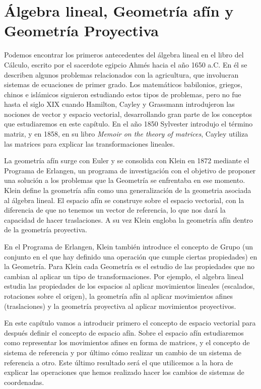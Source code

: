 \documentclass[a4paper,11pt, oneside]{book}
\begin{document}
\section{Álgebra lineal, Geometría afín y Geometría Proyectiva}
Podemos encontrar los primeros antecedentes del álgebra lineal en el libro del Cálculo, escrito por el sacerdote egipcio Ahmés hacia el año 1650 a.C. En él se describen algunos problemas relacionados con la agricultura, que involucran sistemas de ecuaciones de primer grado. Los matemáticos babilonios, griegos, chinos e islámicos siguieron estudiando estos tipos de problemas, pero no fue hasta el siglo  XIX cuando Hamilton, Cayley y Grassmann introdujeron las nociones de vector y espacio vectorial, desarrollando gran parte de los conceptos que estudiaremos en este capítulo. En el año 1850 Sylvester introdujo el término matriz, y en 1858, en su libro \textit{Memoir on the theory of matrices}, Cayley utiliza las matrices para explicar las transformaciones lineales.

La geometría afín surge con Euler y se consolida con Klein en 1872 mediante el Programa de Erlangen, un programa de investigación con el objetivo de proponer una solución a los problemas que la Geometría se enfrentaba en ese momento. Klein define la geometría afín como una generalización de la geometria asociada al álgebra lineal. El espacio afín se construye sobre el espacio vectorial, con la diferencia de que no tenemos un vector de referencia, lo que nos dará la capacidad de hacer traslaciones. A su vez Klein engloba la geometría afín dentro de la geometría proyectiva.

En el Programa de Erlangen, Klein también introduce el concepto de Grupo (un conjunto en el que hay definido una operación que cumple ciertas propiedades) en la Geometría. Para Klein cada Geometría es el estudio de las propiedades que no cambian al aplicar un tipo de transformaciones. Por ejemplo, el algebra lineal estudia las propiedades de los espacios al aplicar movimientos lineales (escalados, rotaciones sobre el origen), la geometría afín al aplicar movimientos afines (traslaciones) y la geometría proyectiva al aplicar movimientos proyectivos.

En este capítulo vamos a introducir primero el concepto de espacio vectorial para después definir el concepto de espacio afín. Sobre el espacio afín estudiaremos como representar los movimientos afines en forma de matrices, y el concepto de sistema de referencia y por último cómo realizar un cambio de un sistema de referencia a otro. Este último resultado será el que utilicemos a la hora de explicar las operaciones que hemos realizado hacer los cambios de sistemas de coordenadas.
\end{document}
